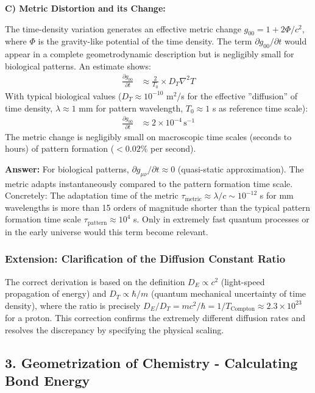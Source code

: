 	\textbf{C) Metric Distortion and its Change:}
	
	The time-density variation generates an effective metric change $g_{00} = 1 + 2\Phi/c^2$, where $\Phi$ is the gravity-like potential of the time density. The term $\partial g_{00}/\partial t$ would appear in a complete geometrodynamic description but is negligibly small for biological patterns. An estimate shows:
	\begin{align*}
		\frac{\partial g_{00}}{\partial t} &\approx \frac{2}{T_0} \times D_T \nabla^2 T
	\end{align*}
	With typical biological values ($D_T \approx 10^{-10}$ m$^2$/s for the effective ''diffusion'' of time density, $\lambda \approx 1$ mm for pattern wavelength, $T_0 \approx 1$ s as reference time scale):
	\begin{align*}
		\frac{\partial g_{00}}{\partial t} &\approx 2 \times 10^{-4} \, \text{s}^{-1}
	\end{align*}
	The metric change is negligibly small on macroscopic time scales (seconds to hours) of pattern formation ($< 0.02\%$ per second).
	
	\textbf{Answer:} For biological patterns, $\partial g_{\mu\nu}/\partial t \approx 0$ (quasi-static approximation). The metric adapts instantaneously compared to the pattern formation time scale. Concretely: The adaptation time of the metric $\tau_{\text{metric}} \approx \lambda/c \sim 10^{-12}$ s for mm wavelengths is more than 15 orders of magnitude shorter than the typical pattern formation time scale $\tau_{\text{pattern}} \approx 10^4$ s. Only in extremely fast quantum processes or in the early universe would this term become relevant.
	
	\subsubsection*{Extension: Clarification of the Diffusion Constant Ratio}
	The correct derivation is based on the definition $D_E \propto c^2$ (light-speed propagation of energy) and $D_T \propto \hbar / m$ (quantum mechanical uncertainty of time density), where the ratio is precisely $D_E / D_T = m c^2 / \hbar = 1 / T_{\text{Compton}} \approx 2.3 \times 10^{23}$ for a proton. This correction confirms the extremely different diffusion rates and resolves the discrepancy by specifying the physical scaling.
	
	\subsection*{3. Geometrization of Chemistry - Calculating Bond Energy}
	
